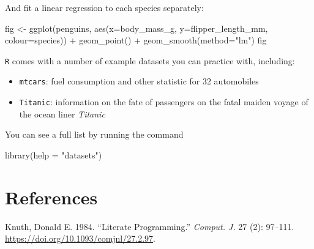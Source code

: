 \documentclass[
  letterpaper,
  DIV=11,
  numbers=noendperiod]{scrreprt}
\newenvironment{Shaded}{\begin{snugshade}}{\end{snugshade}}
\newcommand{\AttributeTok}[1]{\textcolor[rgb]{0.40,0.45,0.13}{#1}}
\newcommand{\FunctionTok}[1]{\textcolor[rgb]{0.28,0.35,0.67}{#1}}
\newcommand{\NormalTok}[1]{\textcolor[rgb]{0.00,0.23,0.31}{#1}}
\newcommand{\OtherTok}[1]{\textcolor[rgb]{0.00,0.23,0.31}{#1}}
\newcommand{\SpecialCharTok}[1]{\textcolor[rgb]{0.37,0.37,0.37}{#1}}
\newcommand{\StringTok}[1]{\textcolor[rgb]{0.13,0.47,0.30}{#1}}
\providecommand{\tightlist}{%
  \setlength{\itemsep}{0pt}\setlength{\parskip}{0pt}}\usepackage{longtable,booktabs,array}
\newlength{\cslhangindent}
\newenvironment{CSLReferences}[2] %
 {\begin{list}{}{%
  \setlength{\itemindent}{0pt}
  \setlength{\leftmargin}{0pt}
  \setlength{\parsep}{0pt}
  \ifodd #1
   \setlength{\leftmargin}{\cslhangindent}
   \setlength{\itemindent}{-1\cslhangindent}
  \fi
  \setlength{\itemsep}{#2\baselineskip}}}
 {\end{list}}
\begin{document}
\begin{tcolorbox}
And fit a linear regression to each species separately:

\begin{Shaded}
\begin{Highlighting}[]
\NormalTok{fig }\OtherTok{\textless{}{-}} \FunctionTok{ggplot}\NormalTok{(penguins, }\FunctionTok{aes}\NormalTok{(}\AttributeTok{x=}\NormalTok{body\_mass\_g, }\AttributeTok{y=}\NormalTok{flipper\_length\_mm, }\AttributeTok{colour=}\NormalTok{species)) }\SpecialCharTok{+}
         \FunctionTok{geom\_point}\NormalTok{() }\SpecialCharTok{+}
         \FunctionTok{geom\_smooth}\NormalTok{(}\AttributeTok{method=}\StringTok{"lm"}\NormalTok{)}
\NormalTok{fig}
\end{Highlighting}
\end{Shaded}

\end{tcolorbox}

\begin{tcolorbox}[enhanced jigsaw, toptitle=1mm, bottomtitle=1mm, opacityback=0, arc=.35mm, breakable, titlerule=0mm, colback=white, colframe=quarto-callout-note-color-frame, coltitle=black, rightrule=.15mm, title=\textcolor{quarto-callout-note-color}{\faInfo}\hspace{0.5em}{Note}, bottomrule=.15mm, toprule=.15mm, leftrule=.75mm, colbacktitle=quarto-callout-note-color!10!white, opacitybacktitle=0.6, left=2mm]

\texttt{R} comes with a number of example datasets you can practice
with, including:

\begin{itemize}
\tightlist
\item
  \texttt{mtcars}: fuel consumption and other statistic for 32
  automobiles
\item
  \texttt{Titanic}: information on the fate of passengers on the fatal
  maiden voyage of the ocean liner \emph{Titanic}
\end{itemize}

You can see a full list by running the command

\begin{Shaded}
\begin{Highlighting}[]
\FunctionTok{library}\NormalTok{(}\AttributeTok{help =} \StringTok{"datasets"}\NormalTok{)}
\end{Highlighting}
\end{Shaded}

\end{tcolorbox}


\chapter*{References}\label{references}


\label{refs}
\begin{CSLReferences}{1}{0}
Knuth, Donald E. 1984. {``Literate Programming.''} \emph{Comput. J.} 27
(2): 97--111. \url{https://doi.org/10.1093/comjnl/27.2.97}.

\end{CSLReferences}
\end{document}
